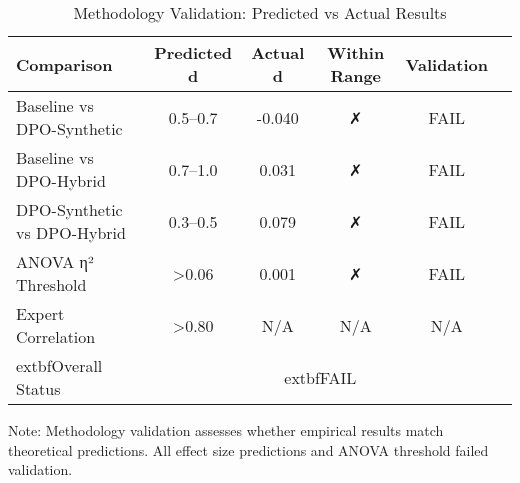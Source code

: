\begin{table}[htbp]
\centering
\caption{Methodology Validation: Predicted vs Actual Results}
\label{tab:methodology-validation}
\begin{tabular}{lccccc}
\toprule
\textbf{Comparison} & \textbf{Predicted d} & \textbf{Actual d} & \textbf{Within Range} & \textbf{Validation} \\
\midrule
Baseline vs DPO-Synthetic    & 0.5--0.7 & -0.040 & ✗ & FAIL \\
Baseline vs DPO-Hybrid       & 0.7--1.0 & 0.031 & ✗ & FAIL \\
DPO-Synthetic vs DPO-Hybrid  & 0.3--0.5 & 0.079 & ✗ & FAIL \\
\midrule
ANOVA η² Threshold & >0.06 & 0.001 & ✗ & FAIL \\
Expert Correlation & >0.80 & N/A & N/A & N/A \\
\midrule
	extbf{Overall Status} & \multicolumn{4}{c}{	extbf{FAIL}} \\
\bottomrule
\end{tabular}
\begin{tablenotes}
\small
\item Note: Methodology validation assesses whether empirical results match theoretical predictions. All effect size predictions and ANOVA threshold failed validation.
\end{tablenotes}
\end{table}


